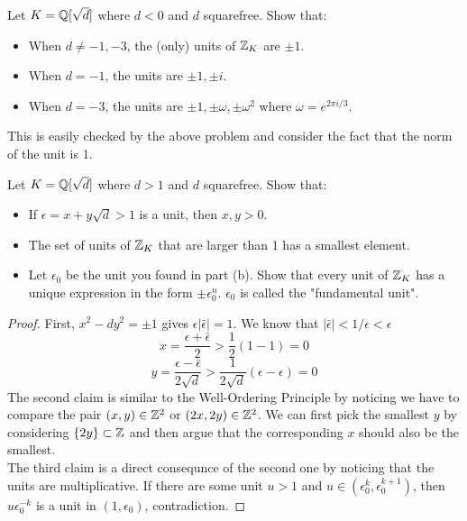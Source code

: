 \documentclass[12pt,twoside=semi,openright,numbers=noenddot]{scrbook}
\begin{document}
\begin{problem}
    Let $K = \mathbb Q[\sqrt{d}]$ where $d < 0$ and $d$ squarefree. 
    Show that: 
    \begin{itemize}
        \item When $d \neq -1, -3$, the (only) units of $\mathbb Z_K$ are $\pm 1$.
        \item When $d = -1$, the units are $\pm 1, \pm i$.
        \item When $d = -3$, the units are $\pm 1, \pm \omega, \pm \omega^2$ where $\omega = e^{2\pi i/3}$.
    \end{itemize}
\end{problem}
    This is easily checked by the above problem and consider the fact that the norm of the unit is 1.

\begin{problem}
    Let $K = \mathbb Q[\sqrt{d}]$ where $d >1$ and $d$ squarefree. 
    Show that: 
    \begin{itemize}
        \item If $\epsilon = x+y\sqrt{d} > 1$ is a unit, then $x, y > 0$.
        \item The set of units of $\mathbb Z_K$ that are larger than 1 has a smallest element.
        \item Let $\epsilon_0$ be the unit you found in part (b). Show that every unit of $\mathbb Z_K$ has a unique expression in the form $\pm \epsilon_0^n$.
        $\epsilon_0$ is called the "fundamental unit".
    \end{itemize}
\end{problem}
    \begin{proof}
        First, $x^2-dy^2 = \pm 1$ gives $\epsilon|\bar{\epsilon}| = 1$. We know that $|\bar{\epsilon}| < 1/\epsilon < \epsilon$
        $$ x = \frac{\epsilon + \bar{\epsilon}}{2} > \frac{1}{2}(1-1) = 0$$
        $$ y = \frac{\epsilon - \bar{\epsilon}}{2\sqrt{d}} > \frac{1}{2\sqrt{d}}(\epsilon-\epsilon) = 0$$
        The second claim is similar to the Well-Ordering Principle by noticing we have to compare the pair $(x,y) \in \mathbb Z^2$ or $(2x, 2y) \in \mathbb Z^2$. We can first pick the smallest $y$
        by considering $\{2y\} \subset \mathbb Z$ and then argue that the corresponding $x$ should also be the smallest. \\
        The third claim is a direct consequnce of the second one by noticing that the units are multiplicative. If there are some unit $u > 1$ and $u \in (\epsilon_0^k, \epsilon_0^{k+1})$, 
        then $u\epsilon_0^{-k}$ is a unit in $(1, \epsilon_0)$, contradiction.
    \end{proof}
\end{document}
